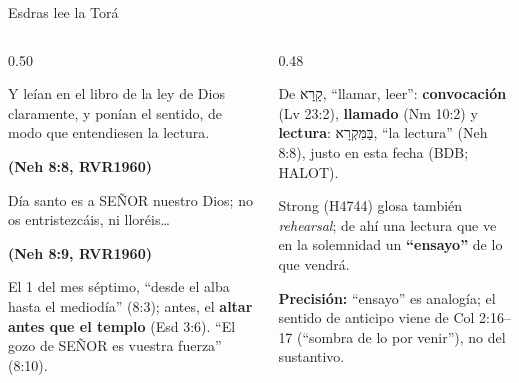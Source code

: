 \documentclass[hyperref={bookmarks=false},aspectratio=169]{beamer}
\newcommand{\heb}[1]{\mbox{\foreignlanguage{hebrew}{#1}}}
\newcommand{\SENOR}{S{\fontsize{0.78em}{1em}\selectfont EÑOR}}
\newcommand{\fuente}[1]{\par\hfill{\upshape\bfseries\footnotesize\textcolor{tierraroja}{#1}}}
\newcommand{\destacar}[1]{\textbf{\textcolor{tierraroja}{#1}}}
\newcommand{\precision}[1]{{\footnotesize\color{sepia}\textbf{Precisión:} #1}}
\begin{document}
\begin{frame}{Esdras lee la Torá}
\begin{columns}[t,onlytextwidth]
\begin{column}{0.50\textwidth}
\begin{cita}Y leían en el libro de la ley de Dios claramente, y ponían el sentido, de modo que entendiesen la lectura.\fuente{(Neh 8:8, RVR1960)}\end{cita}
\begin{cita}Día santo es a \SENOR{} nuestro Dios; no os entristezcáis, ni lloréis\ldots\fuente{(Neh 8:9, RVR1960)}\end{cita}
\scriptsize\RaggedRight El 1 del mes séptimo, ``desde el alba hasta el mediodía'' (8:3); antes, el \destacar{altar antes que el templo} (Esd 3:6). ``El gozo de \SENOR{} es vuestra fuerza'' (8:10).
\end{column}
\begin{column}{0.48\textwidth}
\begin{tcolorbox}[colback=papiro,colframe=tierraroja,boxrule=0.8pt,arc=3pt,fontupper=\scriptsize,title={\heb{מִקְרָא} \emph{mikrá}},fonttitle=\bfseries\scriptsize,colbacktitle=tierraroja,coltitle=papiro]
\RaggedRight De \heb{קָרָא}, ``llamar, leer'': \textbf{convocación} (Lv 23:2), \textbf{llamado} (Nm 10:2) y \textbf{lectura}: \heb{בַּמִּקְרָא}, ``la lectura'' (Neh 8:8), justo en esta fecha (BDB; HALOT).\par\smallskip
Strong (H4744) glosa también \emph{rehearsal}; de ahí una lectura que ve en la solemnidad un \destacar{``ensayo''} de lo que vendrá.
\end{tcolorbox}
\precision{``ensayo'' es analogía; el sentido de anticipo viene de Col 2:16--17 (``sombra de lo por venir''), no del sustantivo.}
\end{column}
\end{columns}
\end{frame}
\end{document}
